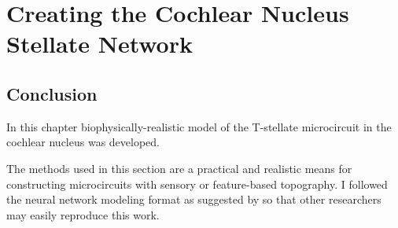 \documentclass[11pt,a4paper %
]{book} %
\begin{document}

\setcounter{chapter}{2}
\chapter[Simple Responses]{Creating the Cochlear Nucleus Stellate Network}
\label{sec:SimpleResponsesChapter}



\newpage

\newpage

\newpage

% 
\newpage


\section{Conclusion}

In this chapter biophysically-realistic model of the
T-stellate microcircuit in the cochlear nucleus was developed.

\medskip{}

The methods used in this section are a practical and realistic means
for constructing microcircuits with sensory or feature-based
topography.  I followed the neural network modeling format as
suggested by \citet{NordlieGewaltigEtAl:2009} so that other
researchers may easily reproduce this work.


\appendix


 

\newpage
\listoftodos
\end{document}
